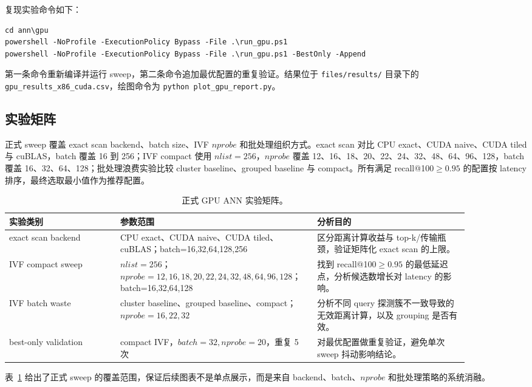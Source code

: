 \documentclass[10pt,a4paper]{article}
\begin{document}
复现实验命令如下：
\begin{verbatim}
cd ann\gpu
powershell -NoProfile -ExecutionPolicy Bypass -File .\run_gpu.ps1
powershell -NoProfile -ExecutionPolicy Bypass -File .\run_gpu.ps1 -BestOnly -Append
\end{verbatim}
第一条命令重新编译并运行 sweep，第二条命令追加最优配置的重复验证。结果位于 \texttt{files/results/} 目录下的 \texttt{gpu\_results\_x86\_cuda.csv}，绘图命令为 \texttt{python plot\_gpu\_report.py}。

\subsection{实验矩阵}

正式 sweep 覆盖 exact scan backend、batch size、IVF $nprobe$ 和批处理组织方式。exact scan 对比 CPU exact、CUDA naive、CUDA tiled 与 cuBLAS，batch 覆盖 16 到 256；IVF compact 使用 $nlist=256$，$nprobe$ 覆盖 12、16、18、20、22、24、32、48、64、96、128，batch 覆盖 16、32、64、128；批处理浪费实验比较 cluster baseline、grouped baseline 与 compact。所有满足 recall@100$\ge0.95$ 的配置按 latency 排序，最终选取最小值作为推荐配置。

\begin{table}[H]
\centering
\small
\caption{正式 GPU ANN 实验矩阵。}
\label{tab:experiment-matrix}
\begin{tabular}{p{0.22\linewidth}p{0.36\linewidth}p{0.30\linewidth}}
\toprule
实验类别 & 参数范围 & 分析目的 \\
\midrule
exact scan backend & CPU exact、CUDA naive、CUDA tiled、cuBLAS；batch=16,32,64,128,256 & 区分距离计算收益与 top-k/传输瓶颈，验证矩阵化 exact scan 的上限。 \\
IVF compact sweep & $nlist=256$；$nprobe=12,16,18,20,22,24,32,48,64,96,128$；batch=16,32,64,128 & 找到 recall@100$\ge0.95$ 的最低延迟点，分析候选数增长对 latency 的影响。 \\
IVF batch waste & cluster baseline、grouped baseline、compact；$nprobe=16,22,32$ & 分析不同 query 探测簇不一致导致的无效距离计算，以及 grouping 是否有效。 \\
best-only validation & compact IVF，$batch=32,nprobe=20$，重复 5 次 & 对最优配置做重复验证，避免单次 sweep 抖动影响结论。 \\
\bottomrule
\end{tabular}
\end{table}
表~\ref{tab:experiment-matrix} 给出了正式 sweep 的覆盖范围，保证后续图表不是单点展示，而是来自 backend、batch、$nprobe$ 和批处理策略的系统消融。
\end{document}
